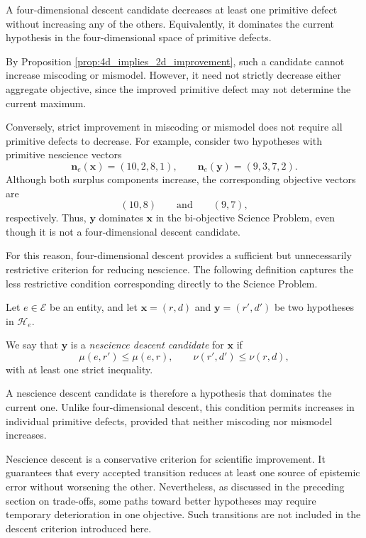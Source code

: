A four-dimensional descent candidate decreases at least
one primitive defect without increasing any of the others.
Equivalently, it dominates the current hypothesis in the
four-dimensional space of primitive defects.

By Proposition \ref{prop:4d_implies_2d_improvement},
such a candidate cannot increase miscoding or mismodel.
However, it need not strictly decrease either aggregate
objective, since the improved primitive defect may not
determine the current maximum.

Conversely, strict improvement in miscoding or mismodel
does not require all primitive defects to decrease.
For example, consider two hypotheses with primitive
nescience vectors
\[
\mathbf n_e(\mathbf{x})=(10,2,8,1),
\qquad
\mathbf n_e(\mathbf{y})=(9,3,7,2).
\]
Although both surplus components increase, the corresponding
objective vectors are
\[
(10,8)
\qquad\text{and}\qquad
(9,7),
\]
respectively. Thus, $\mathbf{y}$ dominates $\mathbf{x}$
in the bi-objective Science Problem, even though it is not
a four-dimensional descent candidate.

For this reason, four-dimensional descent provides a
sufficient but unnecessarily restrictive criterion for
reducing nescience. The following definition captures
the less restrictive condition corresponding directly
to the Science Problem.

\begin{definition}
Let $e\in\mathcal E$ be an entity, and let
$\mathbf{x}=(r,d)$ and $\mathbf{y}=(r',d')$
be two hypotheses in $\mathcal H_e$.

We say that $\mathbf{y}$ is a
\emph{nescience descent candidate}
for $\mathbf{x}$ if
\[
\mu(e,r')\leq\mu(e,r),
\qquad
\nu(r',d')\leq\nu(r,d),
\]
with at least one strict inequality.
\end{definition}

A nescience descent candidate is therefore a hypothesis
that dominates the current one. Unlike four-dimensional
descent, this condition permits increases in individual
primitive defects, provided that neither miscoding nor
mismodel increases.

Nescience descent is a conservative criterion for scientific
improvement. It guarantees that every accepted transition
reduces at least one source of epistemic error without
worsening the other. Nevertheless, as discussed in the
preceding section on trade-offs, some paths toward better
hypotheses may require temporary deterioration in one
objective. Such transitions are not included in the
descent criterion introduced here.


